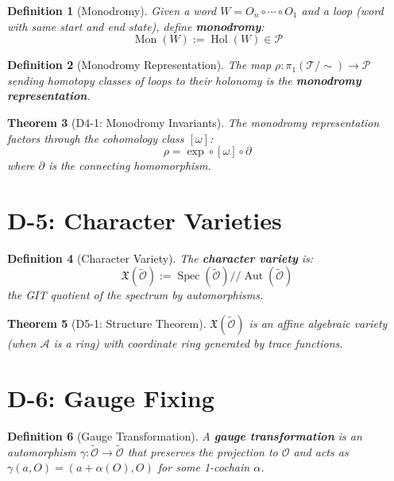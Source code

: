 \documentclass[12pt, oneside]{article}
\newtheorem{theorem}{Theorem}[section]
\newtheorem{definition}[theorem]{Definition}
\DeclareMathOperator{\Hol}{Hol}
\DeclareMathOperator{\Spec}{Spec}
\newcommand{\A}{\mathcal{A}}
\newcommand{\T}{\mathcal{T}}
\newcommand{\Opr}{\mathcal{O}}
\newcommand{\wtilde}{\widetilde}
\begin{document}
\begin{definition}[Monodromy]
Given a word $W = O_n \circ \cdots \circ O_1$ and a loop (word with same start and end state), define \textbf{monodromy}:
\begin{equation}
\operatorname{Mon}(W) := \Hol(W) \in \mathcal{P}
\end{equation}
\end{definition}

\begin{definition}[Monodromy Representation]
The map $\rho: \pi_1(\T/\sim) \rightarrow \mathcal{P}$ sending homotopy classes of loops to their holonomy is the \textbf{monodromy representation}.
\end{definition}

\begin{theorem}[D4-1: Monodromy Invariants]
The monodromy representation factors through the cohomology class $[\omega]$:
\begin{equation}
\rho = \exp \circ [\omega] \circ \partial
\end{equation}
where $\partial$ is the connecting homomorphism.
\end{theorem}

\section{D-5: Character Varieties}

\begin{definition}[Character Variety]
The \textbf{character variety} is:
\begin{equation}
\mathfrak{X}(\wtilde{\Opr}) := \Spec(\wtilde{\Opr}) / \!/ \operatorname{Aut}(\wtilde{\Opr})
\end{equation}
the GIT quotient of the spectrum by automorphisms.
\end{definition}

\begin{theorem}[D5-1: Structure Theorem]
$\mathfrak{X}(\wtilde{\Opr})$ is an affine algebraic variety (when $\A$ is a ring) with coordinate ring generated by trace functions.
\end{theorem}

\section{D-6: Gauge Fixing}

\begin{definition}[Gauge Transformation]
A \textbf{gauge transformation} is an automorphism $\gamma: \wtilde{\Opr} \rightarrow \wtilde{\Opr}$ that preserves the projection to $\Opr$ and acts as $\gamma(a, O) = (a + \alpha(O), O)$ for some 1-cochain $\alpha$.
\end{definition}
\end{document}
